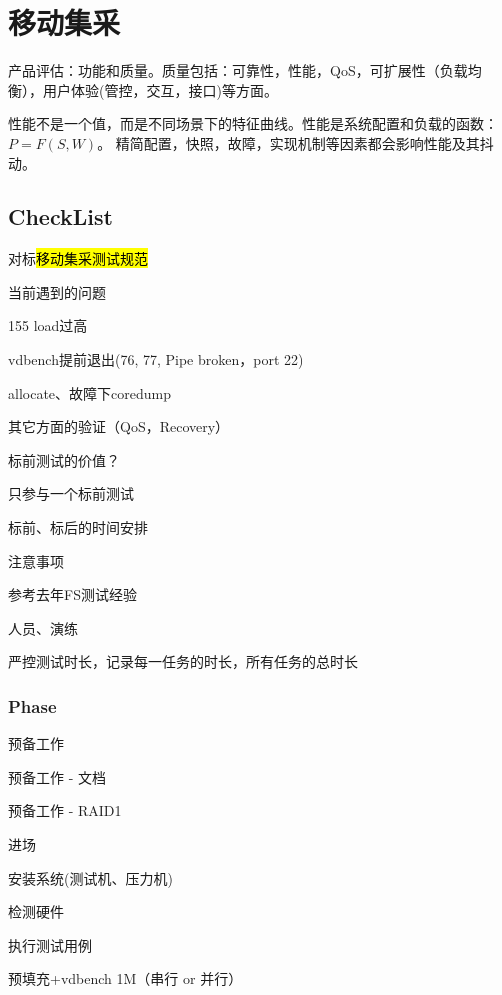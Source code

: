\chapter{移动集采}

产品评估：功能和质量。质量包括：可靠性，性能，QoS，可扩展性（负载均衡），用户体验(管控，交互，接口)等方面。

性能不是一个值，而是不同场景下的特征曲线。性能是系统配置和负载的函数：$P=F(S, W)$。
精简配置，快照，故障，实现机制等因素都会影响性能及其抖动。

\section{CheckList}

对标\hl{移动集采测试规范}

当前遇到的问题
\begin{enumbox}
\item 155 load过高
\item vdbench提前退出(76, 77, Pipe broken，port 22)
\item allocate、故障下coredump
\item 其它方面的验证（QoS，Recovery）
\item 标前测试的价值？
\item 只参与一个标前测试
\item 标前、标后的时间安排
\end{enumbox}

注意事项
\begin{enumbox}
\item 参考去年FS测试经验
\item 人员、演练
\item 严控测试时长，记录每一任务的时长，所有任务的总时长
\end{enumbox}

\subsection{Phase}

\begin{enumbox}
\item 预备工作
\item 预备工作 - 文档
\item 预备工作 - RAID1
\item 进场
\item 安装系统(测试机、压力机)
\item 检测硬件
\item 执行测试用例
\item 预填充+vdbench 1M（串行 or 并行）
\end{enumbox}

